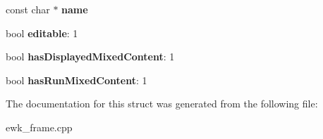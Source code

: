 \begin{DoxyCompactItemize}
\item 
\hypertarget{structEwk__Frame__Smart__Data_a67ba3ea2544604284956f4a9088cee8e}{const char $\ast$ {\bfseries name}}\label{structEwk__Frame__Smart__Data_a67ba3ea2544604284956f4a9088cee8e}

\item 
\hypertarget{structEwk__Frame__Smart__Data_a4be07b844851d068f75de99b6c836aca}{bool {\bfseries editable}\+: 1}\label{structEwk__Frame__Smart__Data_a4be07b844851d068f75de99b6c836aca}

\item 
\hypertarget{structEwk__Frame__Smart__Data_a9a9cee92dc6af43870d546d440716637}{bool {\bfseries has\+Displayed\+Mixed\+Content}\+: 1}\label{structEwk__Frame__Smart__Data_a9a9cee92dc6af43870d546d440716637}

\item 
\hypertarget{structEwk__Frame__Smart__Data_a6c2d0b3394d88ed3531d92efdcf6c460}{bool {\bfseries has\+Run\+Mixed\+Content}\+: 1}\label{structEwk__Frame__Smart__Data_a6c2d0b3394d88ed3531d92efdcf6c460}

\end{DoxyCompactItemize}


The documentation for this struct was generated from the following file\+:\begin{DoxyCompactItemize}
\item 
ewk\+\_\+frame.\+cpp\end{DoxyCompactItemize}
